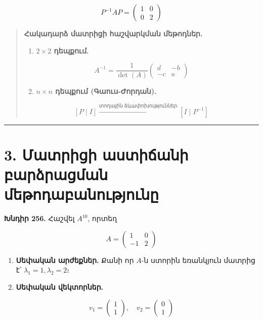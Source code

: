 \documentclass[12pt, a4paper]{article}
\begin{document}
$$
P^{-1} A P =
\begin{pmatrix}
1 & 0 \\
0 & 2
\end{pmatrix}
$$

\begin{quote}
\textbf{Հակադարձ մատրիցի հաշվարկման մեթոդներ.}

\begin{enumerate}
    \item \textbf{$2 \times 2$ դեպքում.}
\end{enumerate}

$$
A^{-1} = \frac{1}{\det(A)}
\begin{pmatrix}
d & -b \\
-c & a
\end{pmatrix}
$$

\begin{enumerate}
    \setcounter{enumi}{1}
    \item \textbf{$n \times n$ դեպքում (Գաուս-Ժորդան).}
\end{enumerate}

$$
[P \mid I] \xrightarrow{\text{տողային ձևափոխություններ}} [I \mid P^{-1}]
$$
\end{quote}

\vspace{1em}
\hrule
\vspace{1em}

\section{3. Մատրիցի աստիճանի բարձրացման մեթոդաբանությունը}

\textbf{Խնդիր 256.} Հաշվել $A^{10}$, որտեղ

$$
A =
\begin{pmatrix}
1 & 0 \\
-1 & 2
\end{pmatrix}
$$

\begin{enumerate}
    \item \textbf{Սեփական արժեքներ.} Քանի որ $A$-ն ստորին եռանկյուն մատրից է՝ $\lambda_1 = 1, \lambda_2 = 2$։
    \item \textbf{Սեփական վեկտորներ.}
\end{enumerate}

$$
v_1 =
\begin{pmatrix}
1 \\
1
\end{pmatrix},
\quad
v_2 =
\begin{pmatrix}
0 \\
1
\end{pmatrix}
$$
\end{document}
